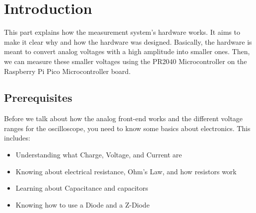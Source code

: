 \section{Introduction}

This part explains how the measurement system's hardware works. It aims to make it clear why and how the hardware was designed. Basically, the hardware is meant to convert analog voltages with a high amplitude into smaller ones. Then, we can measure these smaller voltages using the PR2040 Microcontroller on the Raspberry Pi Pico Microcontroller board.

\subsection{Prerequisites}

Before we talk about how the analog front-end works and the different voltage ranges for the oscilloscope, you need to know some basics about electronics. This includes:

\begin{itemize}
	\item Understanding what Charge, Voltage, and Current are
	\item Knowing about electrical resistance, Ohm's Law, and how resistors work
	\item Learning about Capacitance and capacitors
	\item Knowing how to use a Diode and a Z-Diode
\end{itemize}
